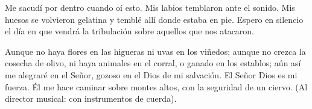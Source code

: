  Me sacudí por dentro cuando oí esto. Mis labios
temblaron ante el sonido. Mis huesos se volvieron gelatina y temblé allí
donde estaba en pie. Espero en silencio el día en que vendrá la
tribulación sobre aquellos que nos atacaron.

 Aunque no haya flores en las higueras ni uvas en los
viñedos; aunque no crezca la cosecha de olivo, ni haya animales en el
corral, o ganado en los establos;  aún así me alegraré en
el Señor, gozoso en el Dios de mi salvación.  El Señor
Dios es mi fuerza. Él me hace caminar sobre montes altos, con la
seguridad de un ciervo. (Al director musical: con instrumentos de
cuerda).
